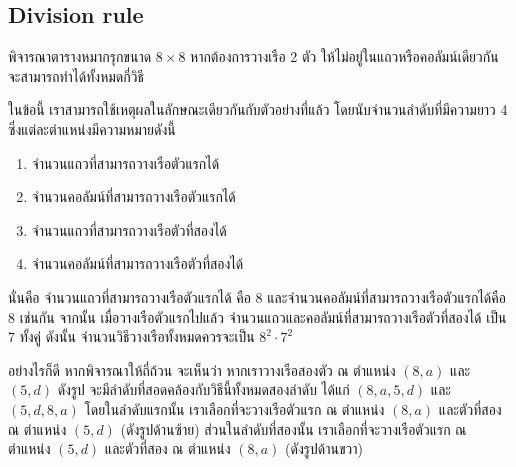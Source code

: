 \subsection{Division rule}

\begin{example}
พิจารณาตารางหมากรุกขนาด $8\times 8$ \enskip หากต้องการวางเรือ 2 ตัว ให้ไม่อยู่ในแถวหรือคอลัมน์เดียวกัน จะสามารถทำได้ทั้งหมดกี่วิธี

ในข้อนี้ เราสามารถใช้เหตุผลในลักษณะเดียวกันกับตัวอย่างที่แล้ว โดยนับจำนวนลำดับที่มีความยาว 4 ซึ่งแต่ละตำแหน่งมีความหมายดังนี้
\begin{enumerate}[]
\item จำนวนแถวที่สามารถวางเรือตัวแรกได้
\item จำนวนคอลัมน์ที่สามารถวางเรือตัวแรกได้
\item จำนวนแถวที่สามารถวางเรือตัวที่สองได้
\item จำนวนคอลัมน์ที่สามารถวางเรือตัวที่สองได้
\end{enumerate}
นั่นคือ จำนวนแถวที่สามารถวางเรือตัวแรกได้ คือ 8 และจำนวนคอลัมน์ที่สามารถวางเรือตัวแรกได้คือ 8 เช่นกัน \enskip จากนั้น เมื่อวางเรือตัวแรกไปแล้ว จำนวนแถวและคอลัมน์ที่สามารถวางเรือตัวที่สองได้ เป็น 7 ทั้งคู่ \enskip ดังนั้น จำนวนวิธีวางเรือทั้งหมดควรจะเป็น $8^2\cdot 7^2$

อย่างไรก็ดี หากพิจารณาให้ถี่ถ้วน จะเห็นว่า หากเราวางเรือสองตัว ณ ตำแหน่ง $(8,a)$ และ $(5,d)$ ดังรูป จะมีลำดับที่สอดคล้องกับวิธีนี้ทั้งหมดสองลำดับ ได้แก่ $(8,a,5,d)$ และ $(5,d,8,a)$ \enskip โดยในลำดับแรกนั้น เราเลือกที่จะวางเรือตัวแรก ณ ตำแหน่ง $(8,a)$ และตัวที่สอง ณ ตำแหน่ง $(5,d)$ (ดังรูปด้านซ้าย) \enskip ส่วนในลำดับที่สองนั้น เราเลือกที่จะวางเรือตัวแรก ณ ตำแหน่ง $(5,d)$ และตัวที่สอง ณ ตำแหน่ง $(8,a)$ (ดังรูปด้านขวา)
%
\begin{center}
%
\quad
%
\end{center}
\end{example}
